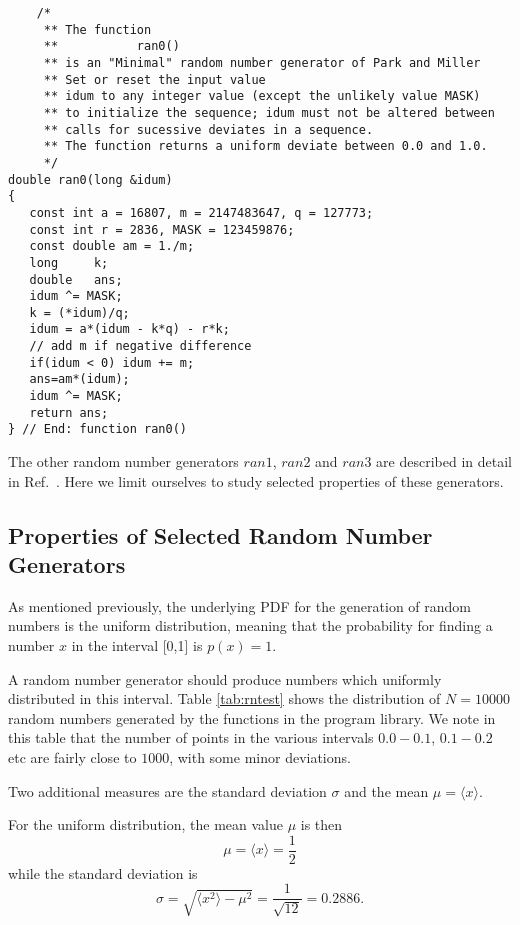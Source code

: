 \begin{lstlisting}
    /*
     ** The function
     **           ran0()
     ** is an "Minimal" random number generator of Park and Miller
     ** Set or reset the input value
     ** idum to any integer value (except the unlikely value MASK)
     ** to initialize the sequence; idum must not be altered between
     ** calls for sucessive deviates in a sequence.
     ** The function returns a uniform deviate between 0.0 and 1.0.
     */
double ran0(long &idum)
{
   const int a = 16807, m = 2147483647, q = 127773;
   const int r = 2836, MASK = 123459876;
   const double am = 1./m;
   long     k;
   double   ans;
   idum ^= MASK;
   k = (*idum)/q;
   idum = a*(idum - k*q) - r*k;
   // add m if negative difference
   if(idum < 0) idum += m;
   ans=am*(idum);
   idum ^= MASK;
   return ans;
} // End: function ran0() 
\end{lstlisting}
The other random number generators $ran1$, $ran2$ and $ran3$ are described
in detail in Ref.~\cite{numrec}. 
Here we limit ourselves to study selected properties of these
generators.

\subsection{Properties of Selected Random Number Generators}

As mentioned previously, the underlying PDF for the generation of
random numbers is the uniform distribution, meaning that the 
probability for finding a number $x$ in the interval [0,1] is $p(x)=1$.

A random number generator should produce numbers which uniformly distributed
in this interval. Table \ref{tab:rntest} shows the distribution of $N=10000$ random
numbers generated by the functions in the program library.
We note in this table that the number of points in the various
intervals $0.0-0.1$, $0.1-0.2$ etc are fairly close to $1000$, with some minor
deviations. 

Two additional measures are the standard deviation $\sigma$ and the mean
$\mu=\langle x\rangle$.

For the uniform distribution, the mean value $\mu$ is then
\[
  \mu=\langle x\rangle=\frac{1}{2}
\]
while the standard deviation is
\[
   \sigma=\sqrt{\langle x^2\rangle-\mu^2}=\frac{1}{\sqrt{12}}=0.2886.
\]

